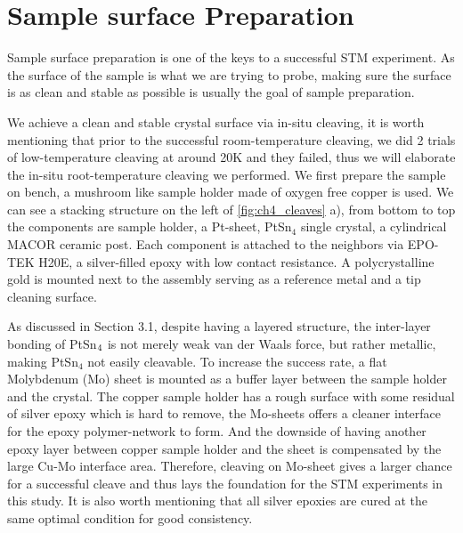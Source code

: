 \section{Sample surface Preparation}
\par Sample surface preparation is one of the keys to a successful STM experiment. As the surface of the sample is what we are trying to probe, making sure the surface is as clean and stable as possible is usually the goal of sample preparation. 

\par We achieve a clean and stable crystal surface via in-situ cleaving, it is worth mentioning that prior to the successful room-temperature cleaving, we did 2 trials of low-temperature cleaving at around 20K and they failed, thus we will elaborate the in-situ root-temperature cleaving we performed. We first prepare the sample on bench, a mushroom like sample holder made of oxygen free copper is used. We can see a stacking structure on the left of \ref{fig:ch4_cleaves} a), from bottom to top the components are sample holder, a Pt-sheet, PtSn$_4$ single crystal, a cylindrical MACOR ceramic post. Each component is attached to the neighbors via EPO-TEK H20E, a silver-filled epoxy with low contact resistance. A polycrystalline gold is mounted next to the assembly serving as a reference metal and a tip cleaning surface. 

\par As discussed in Section 3.1, despite having a layered structure, the inter-layer bonding of PtSn$\textsubscript{4}$ is not merely weak van der Waals force, but rather metallic, making PtSn$_4$ not easily cleavable. To increase the success rate, a flat Molybdenum (Mo) sheet is mounted as a buffer layer between the sample holder and the crystal. The copper sample holder has a rough surface with some residual of silver epoxy which is hard to remove, the Mo-sheets offers a cleaner interface for the epoxy polymer-network to form. And the downside of having another epoxy layer between copper sample holder and the sheet is compensated by the large Cu-Mo interface area. Therefore, cleaving on Mo-sheet gives a larger chance for a successful cleave and thus lays the foundation for the \ac{STM} experiments in this study. It is also worth mentioning that all silver epoxies are cured at the same optimal condition for good consistency. 

